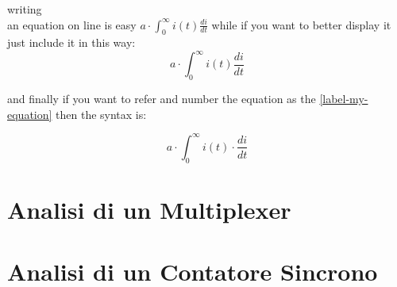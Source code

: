 writing \\
an equation on line is easy $a \cdot \int^{\infty}_0 i(t)
\frac{di}{dt}$
while if you want to better display it just include it in this way:
$$a \cdot \int^{\infty}_0 i(t) \frac{di}{dt}$$

and finally if you want to refer and number the equation as the
\ref{label-my-equation} then the syntax is:

\begin{equation}
a \cdot \int^{\infty}_0 i(t) \cdot \frac{di}{dt}
\label{label-my-equation}
\end{equation}

\section{Analisi di un Multiplexer}



\section{Analisi di un Contatore Sincrono}


